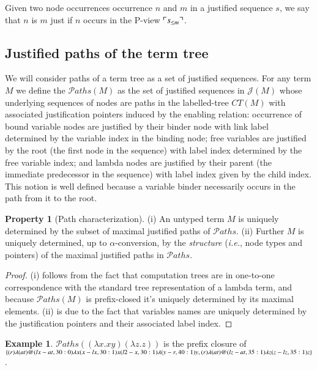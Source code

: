 \documentclass{elsarticle}
\makeatletter
\theoremstyle{plain}
\theoremstyle{definition}
\newtheorem{property}{Property}[section]
\newtheorem{example}{Example}[section]
\theoremstyle{remark}
\newcommand{\ctree}{CT} %
\newcommand\pathset{{\mathcal{P}aths}} %
\renewcommand\ie{{\it i.e.\@\xspace}}
\def\justseqset{\mathcal{J}}
\makeatother
\begin{document}
Given two node occurrences occurrence $n$ and $m$ in a justified sequence $s$, we say that $n$ is  $m$ just if $n$ occurs in the P-view $\ulcorner s_{\leq m} \urcorner$.

\subsection{Justified paths of the term tree}

We will consider paths of a term tree as a set of justified sequences. For any term $M$ we define the  $\pathset(M)$ as the set of justified sequences in $\justseqset(M)$ whose underlying sequences of nodes are paths in the labelled-tree $\ctree(M)$ with associated justification pointers induced by the enabling relation: occurrence of bound variable nodes are justified by their binder node with link label determined by the variable index in the binding node; free variables are justified by the root (the first node in the sequence) with label index determined by the free variable index; and lambda nodes are justified by their parent (the immediate predecessor in the sequence) with label index given by the child index. This notion is well defined because a variable binder necessarily occurs in the path from it to the root.
\begin{property}[Path characterization]
\label{prop:tree_path_charact}
(i) An untyped term $M$ is uniquely determined by the subset of maximal justified paths of $\pathset$.
(ii) Further $M$ is uniquely determined, up to $\alpha$-conversion, by the \emph{structure} (\ie, node types and pointers) of the maximal justified paths in $\pathset$.
\end{property}
\begin{proof}
(i) follows from the fact that computation trees are in one-to-one correspondence with the standard tree representation of a lambda term, and because $\pathset(M)$ is prefix-closed it's uniquely determined by its maximal elements. (ii) is due to the fact that variables names are uniquely determined by the justification pointers and their associated label index.
\end{proof}

\begin{example}
  $\pathset((\lambda x.x y) (\lambda z.z))$ is the prefix closure of
  $\{
  \Pstr{ (r){\lambda} (at){@} (lx-at,30:0){\lambda x} (x-lx,30:1){x} (l2-x,30:1){\lambda} (y-r,40:1){y} },
  \Pstr{ (r){\lambda} (at){@} (lz-at,35:1){\lambda z} (z-lz,35:1){z}}
  \}$.
\end{example}
\end{document}

